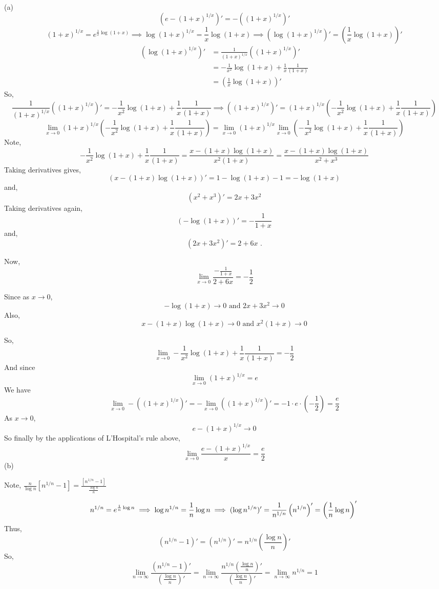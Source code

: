 \documentclass{article}
\begin{document}
(a)
\[(e -(1+x)^{1/x})'  = -((1+x)^{1/x})'\]
\[(1+x)^{1/x} = e^{\frac{1}{x} \log{(1+x)}} \implies \log
  (1+x)^{1/x} = \frac{1}{x} \log{(1+x)} \implies  \left(\log
    (1+x)^{1/x} \right)'= \left(  \frac{1}{x} \log{(1+x)}\right)'\]
\begin{align*}
  \left(\log (1+x)^{1/x} \right)'
  &= \frac{1}{(1+x)^{1/x}} \left( (1+x)^{1/x} \right)'\\
  &= -\frac{1}{x^2}\log(1+x) +\frac{1}{x}\frac{1}{(1+x)}\\
  &= \left(  \frac{1}{x} \log{(1+x)}\right)'
\end{align*}
So,\[ \frac{1}{(1+x)^{1/x}} \left( (1+x)^{1/x} \right)'
  = -\frac{1}{x^2}\log(1+x) +\frac{1}{x}\frac{1}{(1+x)} \implies
  \left( (1+x)^{1/x} \right)'  = (1+x)^{1/x}\left(-\frac{1}{x^2}\log(1+x)
    +\frac{1}{x}\frac{1}{(1+x)}\right)\]
\[\lim_{x\rightarrow 0} (1+x)^{1/x}\left(-\frac{1}{x^2}\log(1+x)
    +\frac{1}{x}\frac{1}{(1+x)}\right) = \lim_{x\rightarrow 0}
  (1+x)^{1/x} \lim_{x\rightarrow 0}\left(-\frac{1}{x^2}\log(1+x)
    +\frac{1}{x}\frac{1}{(1+x)}\right)\]
Note,
\[-\frac{1}{x^2}\log(1+x)
    +\frac{1}{x}\frac{1}{(1+x)} = \frac{x -(1+x)\log(1+x) }
    {x^2(1+x)} = \frac{x -(1+x)\log(1+x) }
    {x^2+x^3}\]
Taking derivatives gives,
  \[(x -(1+x)\log(1+x))' = 1 - \log(1+x) -1 = -\log(1+x)\]
and,
\[(x^2+x^3)' = 2x+3x^2\]
Taking derivatives again,
\[(-\log(1+x))' = -\frac{1}{1+x}\]
and,
\[(2x+3x^2)' = 2+6x\text{ .}\]

Now, \[\lim_{x\rightarrow 0} \frac{-\frac{1}{1+x}}{2+6x} =
  -\frac{1}{2}\]

Since as $x\longrightarrow 0$,\[-\log(1+x) \rightarrow 0\text{ and }
  2x+3x^2 \longrightarrow 0\]
Also, \[x -(1+x)\log(1+x) \longrightarrow 0 \text{ and }
  x^2(1+x)\longrightarrow 0\]

So, \[\lim_{x\rightarrow 0} -\frac{1}{x^2}\log(1+x)
  +\frac{1}{x}\frac{1}{(1+x)} = - \frac{1}{2}\]
And since \[\lim_{x\rightarrow 0} (1+x)^{1/x} = e\]
We have \[\lim_{x\rightarrow 0} -((1+x)^{1/x})' = -\lim_{x\rightarrow
    0} ((1+x)^{1/x})' = -1\cdot e\cdot(-\frac{1}{2}) = \frac{e}{2}\]
As $x\rightarrow 0$,\[e-(1+x)^{1/x} \rightarrow 0\]
So finally by the applications of L'Hospital's rule above,
\[\lim_{x\rightarrow 0} \frac{e-(1+x)^{1/x}}{x} = \frac{e}{2}\]
\newpage
(b)

Note, $\frac{n}{\log n}[n^{1/n} - 1] = \frac{[n^{1/n} -1]}{\frac{\log n}{n}}$

\[
  n^{1/n} = e^{\frac{1}{n}\log n}
  \implies \log  n^{1/n} = \frac{1}{n}\log n
  \implies (\log  n^{1/n})' = \frac{1}{n^{1/n}}\left(n^{1/n}\right)' = \left(\frac{1}{n}\log n\right)'\\
\]
Thus,
\[ (n^{1/n}- 1)' = (n^{1/n})'= n^{1/n}\left(\frac{\log n}{n}\right)'\]
So,\[\lim_{n\rightarrow \infty} \frac{\left(  n^{1/n}
      -1\right)'}{\left(\frac{\log n}{n}\right)'} = \lim_{n\rightarrow
  \infty} \frac{n^{1/n}\left(\frac{\log n}{n}\right)'}{
  \left(\frac{\log n}{n}\right)'} = \lim_{n\rightarrow \infty}
n^{1/n} = 1\]
\end{document}
